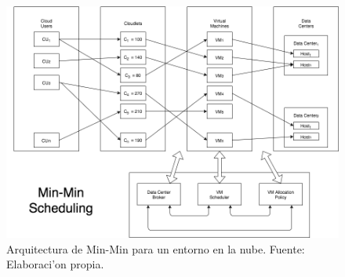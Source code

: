 \begin{figure}
	\caption{Arquitectura de Min-Min para un entorno en la nube. Fuente: Elaboraci'on propia.}
	\centering
	\includegraphics[scale=0.5]{media/imagencinco}
\end{figure}

